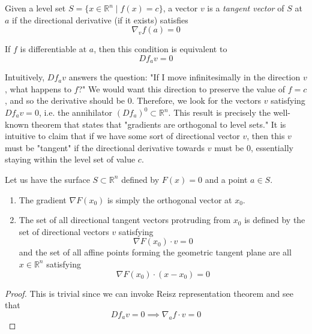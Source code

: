  Given a level set $S = \{ x \in \mathbb{R}^n \mid f(x) = c\}$, a vector $v$ is a \textit{tangent vector} of $S$ at $a$ if the directional derivative (if it exists) satisfies
	\begin{equation}
  	\nabla_v f (a) = 0
	\end{equation}

  If $f$ is differentiable at $a$, then this condition is equivalent to 
	\begin{equation}
  	D f_a v = 0
	\end{equation}

  Intuitively, $D f_a v$ answers the question: "If I move infinitesimally in the direction $v$, what happens to $f$?" We would want this direction to preserve the value of $f = c$, and so the derivative should be $0$. Therefore, we look for the vectors $v$ satisfying $D f_a v = 0$, i.e. the annihilator $(D f_a)^0 \subset \mathbb{R}^n$. This result is precisely the well-known theorem that states that "gradients are orthogonal to level sets." It is intuitive to claim that if we have some sort of directional vector $v$, then this $v$ must be "tangent" if the directional derivative towards $v$ must be $0$, essentially staying within the level set of value $c$. 

  \begin{theorem}
		Let us have the surface $S \subset \mathbb{R}^n$ defined by $F(x) = 0$ and a point $a \in S$. 
		\begin{enumerate}
			\item The gradient $\nabla F(x_0)$ is simply the orthogonal vector at $x_0$. 

			\item The set of all directional tangent vectors protruding from $x_0$ is defined by the set of directional vectors $v$ satisfying 
				\begin{equation}
					\nabla F(x_0) \cdot v = 0
				\end{equation}
				and the set of all affine points forming the geometric tangent plane are all $x \in \mathbb{R}^n$ satisfying 
				\begin{equation}
					\nabla F(x_0) \cdot (x - x_0) = 0
				\end{equation}
		\end{enumerate}
  \end{theorem}
  \begin{proof}
		This is trivial since we can invoke Reisz representation theorem and see that 
		\begin{equation}
			D f_a v = 0 \implies \nabla_a f \cdot v = 0
		\end{equation}
  \end{proof}

